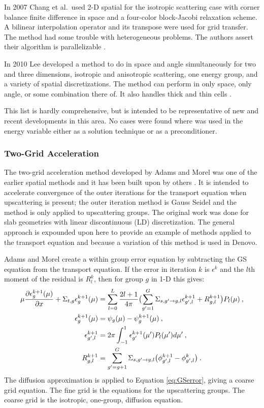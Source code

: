In 2007 Chang et al.\ used 2-D spatial \mg for the isotropic scattering case with corner balance finite difference in space and a four-color block-Jacobi relaxation scheme. A bilinear interpolation operator and its transpose were used for grid transfer. The method had some trouble with heterogeneous problems. The authors assert their algorithm is parallelizable \cite{Chang2007}.

In 2010 Lee developed a method to do \mg in space and angle simultaneously for two and three dimensions, isotropic and anisotropic scattering, one energy group, and a variety of spatial discretizations. The method can perform \mg in only space, only angle, or some combination there of. It also handles thick and thin cells \cite{Lee2010}.

This list is hardly comprehensive, but is intended to be representative of new and recent developments in this area. No cases were found where \mg was used in the energy variable either as a solution technique or as a preconditioner. 

\subsubsection{Two-Grid Acceleration}
The two-grid acceleration method developed by Adams and Morel was one of the earlier spatial \mg methods and it has been built upon by others \cite{Adams1993}. It is intended to accelerate convergence of the outer iterations for the transport equation when upscattering is present; the outer iteration method is Gauss Seidel and the method is only applied to upscattering groups. The original work was done for slab geometries with linear discontinuous (LD) discretization. The general approach is expounded upon here to provide an example of \mg methods applied to the transport equation and because a variation of this method is used in Denovo. 

Adams and Morel create a within group error equation by subtracting the GS equation from the transport equation. If the error in iteration $k$ is $\epsilon^k$ and the $l$th moment of the residual is $R_l^k$, then for group $g$ in 1-D this gives:
%
\begin{align}
   \mu \frac{\partial \epsilon_{g}^{k+1}(\mu)}{\partial x} + \Sigma_{t,g} \epsilon_{g}^{k+1}(\mu) &= \sum_{l=0}^{L}\frac{2l+1}{4\pi} \bigl( \sum_{g'=1}^{G}\Sigma_{s,g' \to g, l} \epsilon_{g',l}^{k+1} 
   +  R_{g,l}^{k+1}\bigr) P_{l}(\mu) \:,\label{eq:GSerror} \\
  \epsilon_{g}^{k+1}(\mu) &= \psi_{g}(\mu) - \psi_{g}^{k+1}(\mu) \:, \\
  \epsilon_{g',l}^{k+1} &= 2\pi \int_{-1}^{1}\epsilon_{g'}^{k+1}(\mu') P_{l}(\mu') d\mu' \:, \\ 
  R_{g,l}^{k+1} &=  \sum_{g'=g+1}^{G}\Sigma_{s,g' \to g, l} \bigl( \phi_{g',l}^{k+1} - \phi_{g',l}^{k} \bigr) \:.
\end{align}
%
The diffusion approximation is applied to Equation \eqref{eq:GSerror}, giving a coarse grid equation. The fine grid is the \Sn equations for the upscattering groups. The coarse grid is the isotropic, one-group, diffusion equation. 

